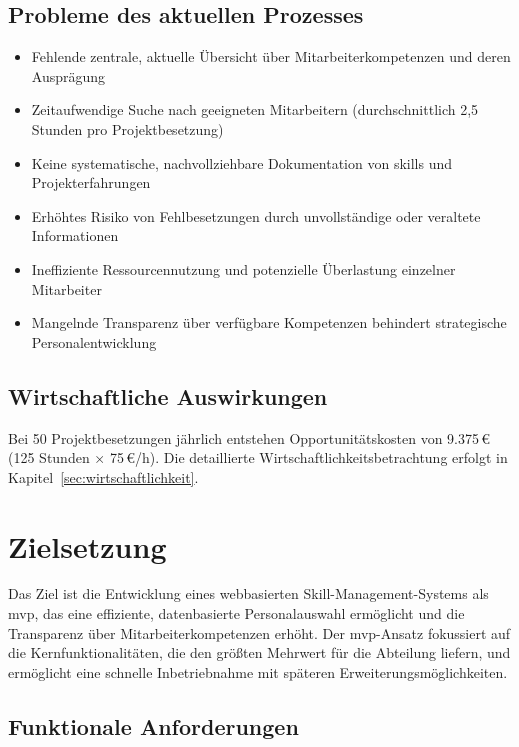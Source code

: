 \subsection{Probleme des aktuellen Prozesses}
\begin{itemize}
    \item Fehlende zentrale, aktuelle Übersicht über Mitarbeiterkompetenzen und deren Ausprägung
    \item Zeitaufwendige Suche nach geeigneten Mitarbeitern (durchschnittlich 2,5 Stunden pro Projektbesetzung\cite{projektbesetzung_aufwand})
    \item Keine systematische, nachvollziehbare Dokumentation von \glspl{skill} und Projekterfahrungen
    \item Erhöhtes Risiko von Fehlbesetzungen durch unvollständige oder veraltete Informationen
    \item Ineffiziente Ressourcennutzung und potenzielle Überlastung einzelner Mitarbeiter
    \item Mangelnde Transparenz über verfügbare Kompetenzen behindert strategische Personalentwicklung
\end{itemize}

\subsection{Wirtschaftliche Auswirkungen}
Bei 50 Projektbesetzungen jährlich entstehen Opportunitätskosten von 9.375\,€ (125 Stunden × 75\,€/h)\cite{projektbesetzung_aufwand,projektleiter_stundensatz}. Die detaillierte Wirtschaftlichkeitsbetrachtung erfolgt in Kapitel~\ref{sec:wirtschaftlichkeit}.

\section{Zielsetzung}

Das Ziel ist die Entwicklung eines webbasierten Skill-Management-Systems als \gls{mvp}, das eine effiziente, datenbasierte Personalauswahl ermöglicht und die Transparenz über Mitarbeiterkompetenzen erhöht. Der \gls{mvp}-Ansatz fokussiert auf die Kernfunktionalitäten, die den größten Mehrwert für die Abteilung liefern, und ermöglicht eine schnelle Inbetriebnahme mit späteren Erweiterungsmöglichkeiten.

\subsection{Funktionale Anforderungen}

